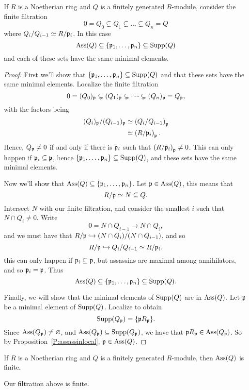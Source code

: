 \documentclass{ximera}
\begin{document}
\begin{theorem}\label{T:AssassinsMinimal}
  If $R$ is a Noetherian ring and $Q$ is a finitely generated
  $R$-module, consider the finite filtration
  \[
  0 = Q_0 \subsetneq Q_1 \subsetneq \dots \subsetneq Q_n = Q 
  \]
  where $Q_i/Q_{i-1} \simeq R/\mathfrak{p}_i$. In this case
  \[
  \operatorname{Ass}(Q) \subseteq \{\mathfrak{p}_1,\dots,\mathfrak{p}_n\}\subseteq \operatorname{Supp}(Q)
  \]
  and each of these sets have the same minimal elements.
  \begin{proof}
    First we'll show that $\{\mathfrak{p}_1,\dots,\mathfrak{p}_n\}\subseteq \operatorname{Supp}(Q)$ and
    that these sets have the same minimal elements. Localize the
    finite filtration
    \[
    0 = (Q_0)_{\mathfrak{p}} \subsetneq (Q_1)_{\mathfrak{p}} \subsetneq \dots \subsetneq (Q_n)_{\mathfrak{p}} = Q_{\mathfrak{p}},
    \]
    with the factors being
    \begin{align*}
      (Q_i)_{\mathfrak{p}}/(Q_{i-1})_{\mathfrak{p}} &\simeq \left(Q_i/Q_{i-1}\right)_{\mathfrak{p}}\\
      &\simeq \left(R/\mathfrak{p}_i\right)_{\mathfrak{p}}.
    \end{align*}
    Hence, $Q_{\mathfrak{p}} \ne 0$ if and only if there is $\mathfrak{p}_i$ such that
    $\left(R/\mathfrak{p}_i\right)_{\mathfrak{p}} \ne 0$. This can only happen if
    $\mathfrak{p}_i\subseteq\mathfrak{p}$, hence $\{\mathfrak{p}_1,\dots,\mathfrak{p}_n\}\subseteq \operatorname{Supp}(Q)$, and
    these sets have the same minimal elements.

    Now we'll show that $\operatorname{Ass}(Q)\subseteq\{\mathfrak{p}_1,\dots,\mathfrak{p}_n\}$. Let
    $\mathfrak{p}\in\operatorname{Ass}(Q)$, this means that
    \[
    R/\mathfrak{p} \simeq N \subseteq Q.
    \]
    Intersect $N$ with our finite filtration, and consider the
    smallest $i$ such that $N\cap Q_i\ne 0$. Write
    \[
    0=N\cap Q_{i-1}\to N\cap Q_i,
    \]
    and we must have that $R/\mathfrak{p} \hookrightarrow (N\cap Q_i)/(N\cap Q_{i-1})$, and so
    \[
    R/\mathfrak{p} \hookrightarrow Q_i/Q_{i-1} \simeq R/\mathfrak{p}_i.
    \]
    this can only happen if $\mathfrak{p}_i\subseteq \mathfrak{p}$, but assassins are
    maximal among annihilators, and so $\mathfrak{p}_i=\mathfrak{p}$. Thus
    \[
    \operatorname{Ass}(Q)\subseteq\{\mathfrak{p}_1,\dots,\mathfrak{p}_n\}\subseteq \operatorname{Supp}(Q).
    \]

    Finally, we will show that the minimal elements of $\operatorname{Supp}(Q)$ are
    in $\operatorname{Ass}(Q)$. Let $\mathfrak{p}$ be a minimal element of
    $\operatorname{Supp}(Q)$. Localize to obtain
    \[
    \operatorname{Supp}(Q_{\mathfrak{p}}) =\{\mathfrak{p} R_{\mathfrak{p}}\}.
    \]
    Since $\operatorname{Ass}(Q_{\mathfrak{p}})\ne \varnothing$, and
    $\operatorname{Ass}(Q_{\mathfrak{p}})\subseteq\operatorname{Supp}(Q_{\mathfrak{p}})$, we have that $\mathfrak{p}
    R_{\mathfrak{p}}\in\operatorname{Ass}(Q_{\mathfrak{p}})$. So by Proposition~\ref{P:assassinlocal},
    $\mathfrak{p}\in\operatorname{Ass}(Q)$.
  \end{proof}
\end{theorem}


\begin{corollary}
  If $R$ is a Noetherian ring and $Q$ is a finitely generated
  $R$-module, then $\operatorname{Ass}(Q)$ is finite.
  \begin{sketch}
    Our filtration above is finite.
  \end{sketch}
\end{corollary}
\end{document}
